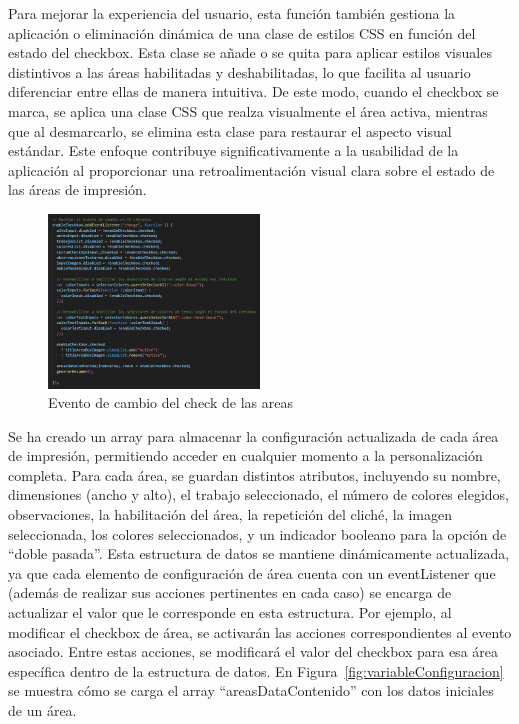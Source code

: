 \documentclass[12pt]{article}
\begin{document}
Para mejorar la experiencia del usuario, esta función también gestiona la aplicación o eliminación dinámica de una clase de estilos CSS en función del 
estado del checkbox. Esta clase se añade o se quita para aplicar estilos visuales distintivos a las áreas habilitadas y deshabilitadas, lo que facilita 
al usuario diferenciar entre ellas de manera intuitiva. De este modo, cuando el checkbox se marca, se aplica una clase CSS que realza visualmente el área activa,
mientras que al desmarcarlo, se elimina esta clase para restaurar el aspecto visual estándar. Este enfoque contribuye significativamente a la usabilidad de la 
aplicación al proporcionar una retroalimentación visual clara sobre el estado de las áreas de impresión.

\begin{figure}[ht]
    \centering
    \includegraphics[width=0.5\textwidth]{imagenesUS3-modal/manejoDesabilitarElementos.png}
    \caption{\label{fig:deshabilitarElementos} Evento de cambio del check de las areas}
    \vspace{\fill}
\end{figure}

Se ha creado un array para almacenar la configuración actualizada de cada área de impresión, permitiendo acceder en cualquier momento a la personalización completa.
Para cada área, se guardan distintos atributos, incluyendo su nombre, dimensiones (ancho y alto), el trabajo seleccionado, 
el número de colores elegidos, observaciones, la habilitación del área, la repetición del cliché, la imagen seleccionada, 
los colores seleccionados, y un indicador booleano para la opción de ``doble pasada''. Esta estructura de datos se mantiene dinámicamente actualizada,
ya que cada elemento de configuración de área cuenta con un eventListener que (además de realizar sus acciones pertinentes en cada caso) se encarga de actualizar el 
valor que le corresponde en esta estructura. Por ejemplo, al modificar el checkbox de área, se activarán las acciones correspondientes 
al evento asociado. Entre estas acciones, se modificará el valor del checkbox para esa área específica dentro de la estructura de datos.
En Figura~\ref{fig:variableConfiguracion} se muestra cómo se carga el array ``areasDataContenido'' con los datos iniciales de un área.
\end{document}
